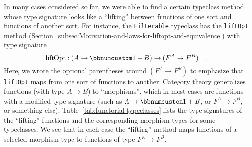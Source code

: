In many cases considered so far, we were able to find a certain typeclass
method whose type signature looks like a \textsf{``}lifting\textsf{''} between functions
of one sort and functions of another sort. For instance, the \lstinline!Filterable!
typeclass has the \lstinline!liftOpt! method (Section~\ref{subsec:Motivation-and-laws-for-liftopt-and-equivalence})
with type signature
\[
\text{liftOpt}:\left(A\rightarrow\bbnum 1+B\right)\rightarrow(F^{A}\rightarrow F^{B})\quad.
\]
Here, we wrote the optional parentheses around $(F^{A}\rightarrow F^{B})$
to emphasize that \lstinline!liftOpt! maps from one sort of functions
to another. Category theory generalizes functions (with type $A\rightarrow B$)
to \textsf{``}morphisms\textsf{''}, which in most cases are functions with a modified
type signature (such as $A\rightarrow\bbnum 1+B$, or $F^{A}\rightarrow F^{B}$,
or something else). Table~\ref{tab:functorial-typeclasses} lists
the type signatures of the \textsf{``}lifting\textsf{''} functions and the corresponding
morphism types for some typeclasses. We see that in each case the
\textsf{``}lifting\textsf{''} method maps functions of a selected morphism type to
functions of type $F^{A}\rightarrow F^{B}$.

